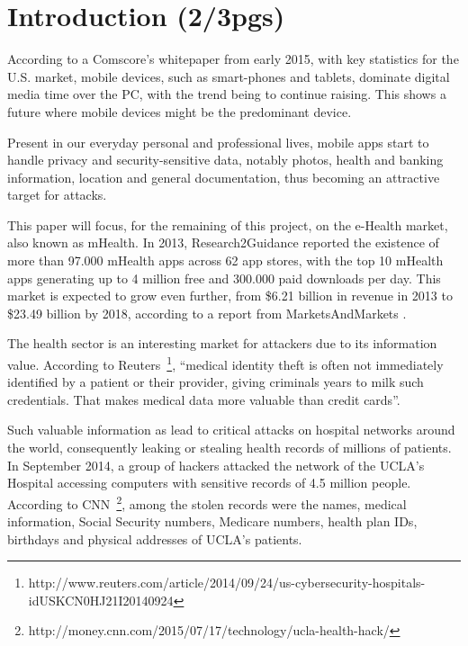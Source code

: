
% 
% 

\section{Introduction (2/3pgs)}


According to a Comscore's whitepaper \cite{comscore} from early 2015, with key statistics for the U.S. market, mobile devices, such as smart-phones and tablets, dominate digital media time over the \ac{PC}, with the trend being to continue raising. This shows a future where mobile devices might be the predominant device.

Present in our everyday personal and professional lives, mobile \ac{apps} start to handle privacy and security-sensitive data, notably photos, health and banking information, location and general documentation, thus becoming an attractive target for attacks.

This paper will focus, for the remaining of this project, on the e-Health market, also known as \ac{mHealth}. In 2013, Research2Guidance \cite{research2guidance} reported the existence of more than 97.000 \ac{mHealth} \ac{apps} across 62 app stores, with the top 10 \ac{mHealth} \ac{apps} generating up to 4 million free and 300.000 paid downloads per day. This market is expected to grow even further, from \$6.21 billion in revenue in 2013 to \$23.49 billion by 2018, according to a report from MarketsAndMarkets \cite{marketsandmarkets}.

The health sector is an interesting market for attackers due to its information value. According to Reuters~\footnote{http://www.reuters.com/article/2014/09/24/us-cybersecurity-hospitals-idUSKCN0HJ21I20140924}, ``medical identity theft is often not immediately identified by a patient or their provider, giving criminals years to milk such credentials. That makes medical data more valuable than credit cards''.

Such valuable information as lead to critical attacks on hospital networks around the world, consequently leaking or stealing health records of millions of patients. In September 2014, a group of hackers attacked the network of the \ac{UCLA}'s Hospital accessing computers with sensitive records of 4.5 million people. According to \ac{CNN}~\footnote{http://money.cnn.com/2015/07/17/technology/ucla-health-hack/}, among the stolen records were the names, medical information, Social Security numbers, Medicare numbers, health plan IDs, birthdays and physical addresses of \ac{UCLA}'s patients.

